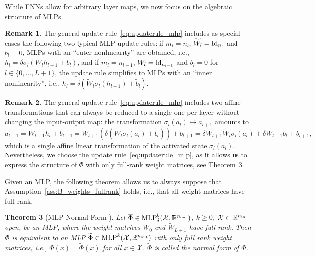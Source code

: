 \documentclass[10pt]{article}
\newtheorem{theorem}{Theorem}[section]
\theoremstyle{definition}
\newtheorem{remark}[theorem]{Remark}
\numberwithin{equation}{section}
\newcommand{\R}{\mathbb{R}}
\newcommand*{\nout}{n_\textup{out}}
\newcommand*{\nin}{n_\textup{in}}
\newcommand*{\MLP}{\textup{MLP}_{\delta}^k(\mathcal{X},\R^{\nout})}
\begin{document}
		While FNNs allow for arbitrary layer maps, we now focus on the algebraic structure of MLPs. 

\begin{remark}
	The general update rule~\eqref{eq:updaterule_mlp} includes as special cases the following two typical MLP update rules: if $m_l = n_l$, $\widetilde{W}_l = \textup{Id}_{n_l}$ and $\tilde{b}_l = 0$, MLPs with an ``outer nonlinearity'' are obtained, i.e., $h_{l} = \delta \sigma_l(W_l h_{l-1}+b_l)$, and if $m_l = n_{l-1}$, $W_l = \textup{Id}_{n_{l-1}}$ and $b_l = 0$ for $l \in \{0,\ldots,L+1\}$, the update rule simplifies to MLPs with an ``inner nonlinearity'', i.e., $h_{l} = \delta (\widetilde{W}_l\sigma_l(h_{l-1})+\tilde{b}_l)$.
\end{remark}

\begin{remark}
    The general update rule~\eqref{eq:updaterule_mlp} includes two affine transformations that can always be reduced to a single one per layer without changing the input-output map: the transformation $\sigma_l(a_l) \mapsto a_{l+1}$ amounts to
	\begin{equation}\label{eq:activatedstates}
		a_{l+1} = W_{l+1} h_l + b_{l+1} = W_{l+1}\left(\delta\left(\widetilde{W}_l \sigma_l(a_l) + \tilde{b}_l\right)\right) + b_{l+1} = \delta W_{l+1}\widetilde{W}_l \sigma_l(a_l) + \delta W_{l+1}\tilde{b}_l + b_{l+1},
	\end{equation}
	which is a single affine linear transformation of the activated state $\sigma_l(a_l)$. Nevertheless, we choose the update rule~\eqref{eq:updaterule_mlp}, as it allows us to express the structure of $\overline{\Phi}$ with only full-rank weight matrices, see Theorem~\ref{th:mlp_normalform}.
\end{remark}

Given an MLP, the following theorem allows us to always suppose that Assumption~\ref{ass:B_weights_fullrank} holds, i.e., that all weight matrices have full rank. 

\begin{theorem}[MLP Normal Form  \cite{kk2025}] \label{th:mlp_normalform}
	Let $\overline{\Phi}\in \MLP$, $k \geq 0$, $\mathcal{X}\subset \R^{\nin}$ open, be an MLP, where the weight matrices $W_0$ and $\widetilde{W}_{L+1}$ have full rank. Then $\overline{\Phi}$ is equivalent to an MLP $\widetilde{\Phi}\in \textup{MLP}^k(\mathcal{X},\R^{\nout})$ with only full rank weight matrices, i.e., $\overline{\Phi}(x) = \widetilde{\Phi}(x)$ for all $x \in \mathcal{X}$. $\widetilde{\Phi}$ is called the \emph{normal form} of $\overline{\Phi}$.
\end{theorem}
\end{document}
